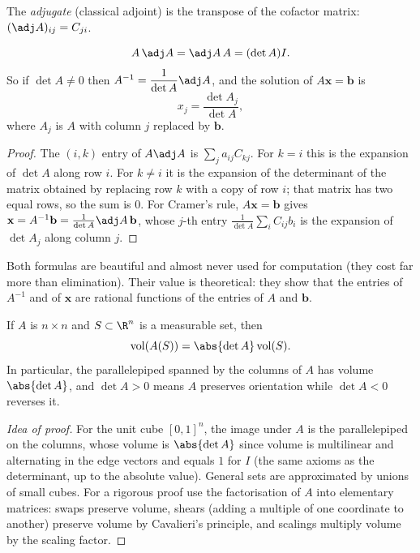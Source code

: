 \begin{definition}[Adjugate]
The \emph{adjugate} (classical adjoint) is the transpose of the cofactor matrix: $(\adj A)_{ij}=C_{ji}$.
\end{definition}

\begin{theorem}\label{thm:cramer}
\[ A\,\adj A=\adj A\,A=(\det A)I. \]
So if $\det A\ne0$ then $A^{-1}=\dfrac{1}{\det A}\adj A$, and the solution of $A\mathbf{x}=\mathbf{b}$ is
\[ x_j=\frac{\det A_j}{\det A},\]
where $A_j$ is $A$ with column $j$ replaced by $\mathbf{b}$.
\end{theorem}

\begin{proof}
The $(i,k)$ entry of $A\adj A$ is $\sum_ja_{ij}C_{kj}$. For $k=i$ this is the expansion of $\det A$ along row $i$. For $k\ne i$ it is the expansion of the determinant of the matrix obtained by replacing row $k$ with a copy of row $i$; that matrix has two equal rows, so the sum is $0$. For Cramer's rule, $A\mathbf{x}=\mathbf{b}$ gives $\mathbf{x}=A^{-1}\mathbf{b}=\frac1{\det A}\adj A\,\mathbf{b}$, whose $j$-th entry $\frac1{\det A}\sum_iC_{ij}b_i$ is the expansion of $\det A_j$ along column $j$.
\end{proof}

Both formulas are beautiful and almost never used for computation (they cost far more than elimination). Their value is theoretical: they show that the entries of $A^{-1}$ and of $\mathbf{x}$ are rational functions of the entries of $A$ and $\mathbf{b}$.

\begin{theorem}\label{thm:detvol}
If $A$ is $n\times n$ and $S\subset\R^n$ is a measurable set, then
\[ \mathrm{vol}(A(S))=\abs{\det A}\,\mathrm{vol}(S). \]
In particular, the parallelepiped spanned by the columns of $A$ has volume $\abs{\det A}$, and $\det A>0$ means $A$ preserves orientation while $\det A<0$ reverses it.
\end{theorem}

\begin{proof}[Idea of proof]
For the unit cube $[0,1]^n$, the image under $A$ is the parallelepiped on the columns, whose volume is $\abs{\det A}$ since volume is multilinear and alternating in the edge vectors and equals $1$ for $I$ (the same axioms as the determinant, up to the absolute value). General sets are approximated by unions of small cubes. For a rigorous proof use the factorisation of $A$ into elementary matrices: swaps preserve volume, shears (adding a multiple of one coordinate to another) preserve volume by Cavalieri's principle, and scalings multiply volume by the scaling factor.
\end{proof}

